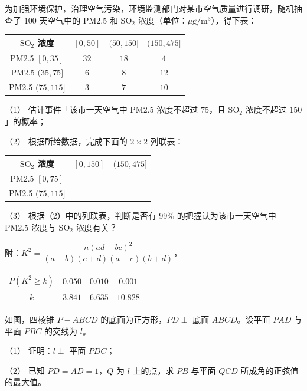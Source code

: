 \begin{question}
为加强环境保护，治理空气污染，环境监测部门对某市空气质量进行调研，随机抽查了 $100$ 天空气中的 PM2.5 和 $\mathrm{SO_2}$ 浓度（单位：$\mu\mathrm g/\mathrm m^3$），得下表：

\begin{center}
\begin{tabular}{cccc}
\toprule
$\mathrm{SO_2}$ 浓度 & $[0,50]$ & $(50,150]$ & $(150,475]$ \\
\midrule
PM2.5 $[0,35]$ & $32$ & $18$ & $4$ \\
PM2.5 $(35,75]$ & $6$ & $8$ & $12$ \\
PM2.5 $(75,115]$ & $3$ & $7$ & $10$ \\
\bottomrule
\end{tabular}
\end{center}

（1） 估计事件「该市一天空气中 PM2.5 浓度不超过 $75$，且 $\mathrm{SO_2}$ 浓度不超过 $150$」的概率；

（2） 根据所给数据，完成下面的 $2\times2$ 列联表：

\begin{center}
\begin{tabular}{ccc}
\toprule
$\mathrm{SO_2}$ 浓度 & $[0,150]$ & $(150,475]$ \\
\midrule
PM2.5 $[0,75]$ &  &  \\
PM2.5 $(75,115]$ &  &  \\
\bottomrule
\end{tabular}
\end{center}

（3） 根据（2）中的列联表，判断是否有 $99\%$ 的把握认为该市一天空气中 PM2.5 浓度与 $\mathrm{SO_2}$ 浓度有关？

附：$K^2=\dfrac{n(ad-bc)^2}{(a+b)(c+d)(a+c)(b+d)}$，

\begin{center}
\begin{tabular}{cccc}
\toprule
$P(K^2\geqslant k)$ & $0.050$ & $0.010$ & $0.001$ \\
\midrule
$k$ & $3.841$ & $6.635$ & $10.828$ \\
\bottomrule
\end{tabular}
\end{center}

\Needspace{0.4\textheight}
\end{question}
\begin{question}
如图，四棱锥 $P-ABCD$ 的底面为正方形，$PD\perp$ 底面 $ABCD$。设平面 $PAD$ 与平面 $PBC$ 的交线为 $l$。
\nopagebreak[4]
\begin{center}\end{center}
\nopagebreak[4]
（1） 证明：$l\perp$ 平面 $PDC$；

（2） 已知 $PD=AD=1$，$Q$ 为 $l$ 上的点，求 $PB$ 与平面 $QCD$ 所成角的正弦值的最大值。

\end{question}
